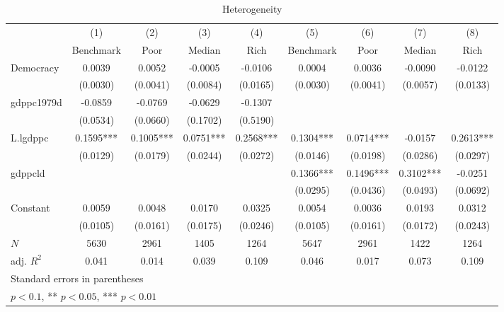 \begin{table}[htbp]\centering
\def\sym#1{\ifmmode^{#1}\else\(^{#1}\)\fi}
\caption{Heterogeneity \label{tab:regression2}}
\begin{tabular}{l*{8}{c}}
\hline\hline
            &\multicolumn{1}{c}{(1)}&\multicolumn{1}{c}{(2)}&\multicolumn{1}{c}{(3)}&\multicolumn{1}{c}{(4)}&\multicolumn{1}{c}{(5)}&\multicolumn{1}{c}{(6)}&\multicolumn{1}{c}{(7)}&\multicolumn{1}{c}{(8)}\\
            &\multicolumn{1}{c}{Benchmark}&\multicolumn{1}{c}{Poor}&\multicolumn{1}{c}{Median}&\multicolumn{1}{c}{Rich}&\multicolumn{1}{c}{Benchmark}&\multicolumn{1}{c}{Poor}&\multicolumn{1}{c}{Median}&\multicolumn{1}{c}{Rich}\\
\hline
Democracy   &      0.0039   &      0.0052   &     -0.0005   &     -0.0106   &      0.0004   &      0.0036   &     -0.0090   &     -0.0122   \\
            &    (0.0030)   &    (0.0041)   &    (0.0084)   &    (0.0165)   &    (0.0030)   &    (0.0041)   &    (0.0057)   &    (0.0133)   \\
[1em]
gdppc1979d  &     -0.0859   &     -0.0769   &     -0.0629   &     -0.1307   &               &               &               &               \\
            &    (0.0534)   &    (0.0660)   &    (0.1702)   &    (0.5190)   &               &               &               &               \\
[1em]
L.lgdppc    &      0.1595***&      0.1005***&      0.0751***&      0.2568***&      0.1304***&      0.0714***&     -0.0157   &      0.2613***\\
            &    (0.0129)   &    (0.0179)   &    (0.0244)   &    (0.0272)   &    (0.0146)   &    (0.0198)   &    (0.0286)   &    (0.0297)   \\
[1em]
gdppcld     &               &               &               &               &      0.1366***&      0.1496***&      0.3102***&     -0.0251   \\
            &               &               &               &               &    (0.0295)   &    (0.0436)   &    (0.0493)   &    (0.0692)   \\
[1em]
Constant    &      0.0059   &      0.0048   &      0.0170   &      0.0325   &      0.0054   &      0.0036   &      0.0193   &      0.0312   \\
            &    (0.0105)   &    (0.0161)   &    (0.0175)   &    (0.0246)   &    (0.0105)   &    (0.0161)   &    (0.0172)   &    (0.0243)   \\
\hline
\(N\)       &        5630   &        2961   &        1405   &        1264   &        5647   &        2961   &        1422   &        1264   \\
adj. \(R^{2}\)&       0.041   &       0.014   &       0.039   &       0.109   &       0.046   &       0.017   &       0.073   &       0.109   \\
\hline\hline
\multicolumn{9}{l}{\footnotesize Standard errors in parentheses}\\
\multicolumn{9}{l}{\footnotesize * \(p<0.1\), ** \(p<0.05\), *** \(p<0.01\)}\\
\end{tabular}
\end{table}
